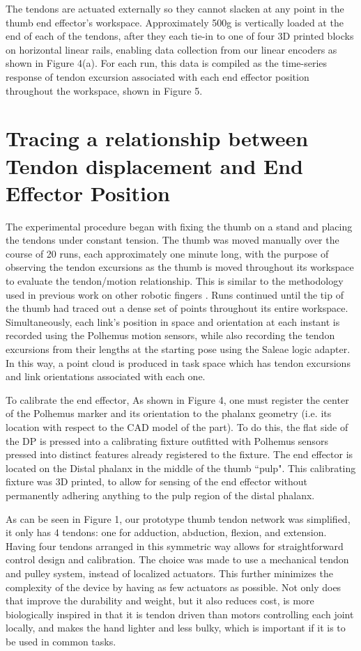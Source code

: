 \documentclass[letterpaper, 10 pt, conference]{ieeeconf}
\begin{document}
The tendons are actuated externally so they cannot slacken at any point in the thumb end effector's workspace. Approximately 500g is vertically loaded at the end of each of the tendons, after they each tie-in to one of four 3D printed blocks on horizontal linear rails, enabling data collection from our linear encoders as shown in Figure 4(a). For each run, this data is compiled as the time-series response of tendon excursion associated with each end effector position throughout the workspace, shown in Figure 5. 

\section{Tracing a relationship between Tendon displacement and End Effector Position}

 The experimental procedure began with fixing the thumb on a stand and placing the tendons under constant tension. The thumb was moved manually over the course of 20 runs, each approximately one minute long, with the purpose of observing the tendon excursions as the thumb is moved throughout its workspace to evaluate the tendon/motion relationship. This is similar to the methodology used in previous work on other robotic fingers \cite{aaah}. Runs continued until the tip of the thumb had traced out a dense set of points throughout its entire workspace. Simultaneously, each link's position in space and orientation at each instant is recorded using the Polhemus motion sensors, while also recording the tendon excursions from their lengths at the starting pose using the Saleae logic adapter. In this way, a point cloud is produced in task space which has tendon excursions and link orientations associated with each one.

To calibrate the end effector, As shown in Figure 4, one must register the center of the Polhemus marker and its orientation to the phalanx geometry (i.e. its location with respect to the CAD model of the part). To do this, the flat side of the DP is pressed into a calibrating fixture outfitted with Polhemus sensors pressed into distinct features already registered to the fixture. The end effector is located on the Distal phalanx in the middle of the thumb ``pulp". This calibrating fixture was 3D printed, to allow for sensing of the end effector without permanently adhering anything to the pulp region of the distal phalanx.

As can be seen in Figure 1, our prototype thumb tendon network was simplified, it only has 4 tendons: one for adduction, abduction, flexion, and extension. Having four tendons arranged in this symmetric way allows for straightforward control design and calibration. The choice was made to use a mechanical tendon and pulley system, instead of localized actuators. This further minimizes the complexity of the device by having as few actuators as possible. Not only does that improve the durability and weight, but it also reduces cost, is more biologically inspired in that it is tendon driven than motors controlling each joint locally, and makes the hand lighter and less bulky, which is important if it is to be used in common tasks.
\end{document}
